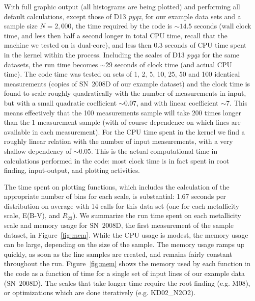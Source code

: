 \documentclass{emulateapj}
\begin{document}
With full graphic output (all histograms are being plotted) and performing all default calculations, except those of D13 \emph{pyqz}, for our example data sets and a sample size $N=2,000$, the time required by the code is $\sim14.5$ seconds (wall clock time, and less then half a second longer in total CPU time, recall that the machine we tested on is dual-core), and less then 0.3 seconds of CPU time spent in the kernel within the process. Including  the scales of D13 \emph{pyqz} for the same datasets, the run time becomes $\sim29$ seconds of clock time (and actual CPU time). 
The code time was tested on sets of 1, 2, 5, 10, 25, 50 and 100 identical measurements (copies of SN~2008D of our example dataset) and the clock time is found to scale roughly quadratically with the number of measurements in input, but with a small quadratic coefficient $\sim0.07$, and with linear coefficient $\sim7$. This means effectively that the 100 measurements sample will take 200 times longer than the 1 measurement sample (with of course dependence on which lines are available in each measurement). For the CPU time spent in the kernel we find a roughly linear relation with the number of input measurements, with a very shallow dependency of $\sim 0.05$. This is the actual computational time in calculations performed in the code: most clock time is in fact spent in root finding, input-output, and plotting activities.


The time spent on plotting functions, which includes the calculation of the appropriate number of bins for each scale, is substantial: 1.67 seconds per distribution on average with 14 calls for this data set (one for each metallicity scale, E(B-V), and $R_{23}$). 
We summarize the run time spent on each metallicity scale and memory usage for SN~2008D, the first measurement of the sample dataset, in Figure~\ref{fig:mem}. While the CPU usage is modest, the memory usage can be large, depending on the size of the sample.  The memory usage ramps up quickly, as soon as the line samples are created, 
and remains fairly constant throughout the run.  Figure~\ref{fig:mem} shows the memory used by each function in the code as a function of time for a single set of input lines of our example data (SN~2008D). The scales that take longer time require the root finding (e.g. M08), or optimizations which are done iteratively (e.g. KD02\_N2O2).
\end{document}

